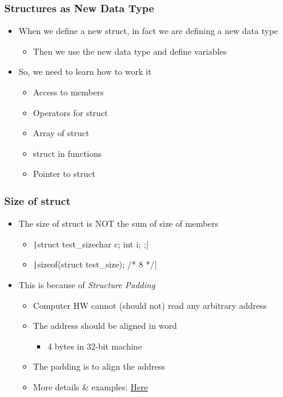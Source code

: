 \documentclass{../c-lecture}
\begin{document}
\begin{frame}
  \frametitle{Structures as New Data Type}
  \begin{itemize}
    \item
      When we define a new struct, in fact we are defining a new data type

    \begin{itemize}
      \item Then we use the new data type and define variables
    \end{itemize}
    \item So, we need to learn how to work it
    \begin{itemize}
      \item Access to members
      \item Operators for struct
      \item Array of struct
      \item struct in functions
      \item Pointer to struct
    \end{itemize}
  \end{itemize}
\end{frame}

\begin{frame}
  \frametitle{Size of struct}
  \begin{itemize}
    \item
      The size of struct is \textsc{\color{RubineRed}NOT} the sum of size of
      members

    \begin{itemize}
      \item \texttt|struct test_size{char c; int i; };|
      \item \texttt|sizeof(struct test_size); /* 8 */|
    \end{itemize}
    \item This is because of \textit{\color{YellowOrange} Structure Padding}
    \begin{itemize}
      \item Computer HW cannot (should not) read any arbitrary address
      \item The address should be aligned in word
      \begin{itemize}
        \item 4 bytes in 32-bit machine
      \end{itemize}
      \item The padding is to align the address
      \item
        More details \& examples:
        \href{https://fresh2refresh.com/c-programming/c-structure-padding}{Here}
    \end{itemize}
  \end{itemize}
\end{frame}
\end{document}
